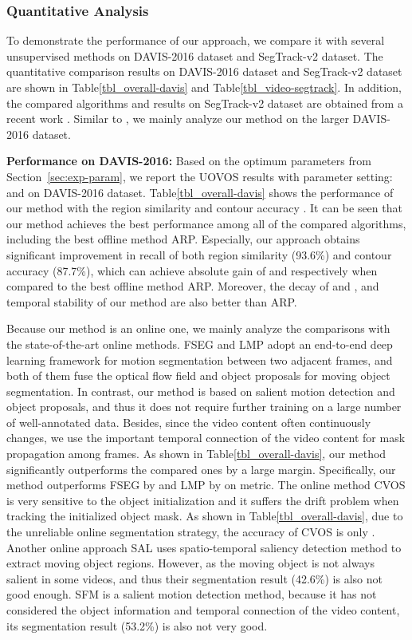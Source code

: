 \documentclass[journal]{IEEEtran}
\makeatletter
\newcommand{\tab}{{Table}\@\xspace}
\makeatother
\begin{document}
\subsubsection{Quantitative Analysis}
To demonstrate the performance of our approach, 
we compare it with several unsupervised methods on DAVIS-2016 \cite{CVPR2016_Perazzi} dataset and SegTrack-v2 \cite{ICCV2013_Li} dataset.
The quantitative comparison results on DAVIS-2016 dataset and SegTrack-v2 dataset are shown in \tab \ref{tbl_overall-davis} and \tab \ref{tbl_video-segtrack}. 
In addition, the compared algorithms and results on SegTrack-v2 dataset are obtained from a recent work \cite{CVPR2017_Jain}.
Similar to \cite{CVPR2017_Jain}, we mainly analyze our method on the larger DAVIS-2016 dataset.

{\bf Performance on DAVIS-2016:}
Based on the optimum parameters from Section~\ref{sec:exp-param}, we report the UOVOS results with parameter setting:  and  on DAVIS-2016 dataset. \tab \ref{tbl_overall-davis} shows the performance of our method with the region similarity  and contour accuracy . It can be seen that our method achieves the best performance among all of the compared algorithms, including the best offline method ARP.
Especially, our approach obtains significant improvement in recall of both region similarity  (93.6\%) and contour accuracy  (87.7\%), which can achieve absolute gain of  and  respectively when compared to the best offline method ARP.
Moreover, the decay of  and , and temporal stability  of our method are also better than ARP.

Because our method is an online one, we mainly analyze the comparisons with the state-of-the-art online methods.
FSEG and LMP adopt an end-to-end deep learning framework for motion segmentation between two adjacent frames,
and both of them fuse the optical flow field and object proposals for moving object segmentation.
In contrast, our method is based on salient motion detection and object proposals, and thus it does not require further training on a large number of well-annotated data. Besides, since the video content often continuously changes, we use the important temporal connection of the video content for mask propagation among frames. As shown in \tab \ref{tbl_overall-davis}, our method significantly outperforms the compared ones by a large margin.
Specifically, our method outperforms FSEG by  and LMP by  on  metric. The online method CVOS is very sensitive to the object initialization and it suffers the drift problem when tracking the initialized object mask. As shown in \tab \ref{tbl_overall-davis}, due to the unreliable online segmentation strategy, the accuracy of CVOS is only .
Another online approach SAL uses spatio-temporal saliency detection method to extract moving object regions. 
However, as the moving object is not always salient in some videos, and thus their segmentation result (42.6\%) is also not good enough.
SFM is a salient motion detection method, because it has not considered the object information and temporal connection of the video content, its segmentation result (53.2\%) is also not very good.
\end{document}
